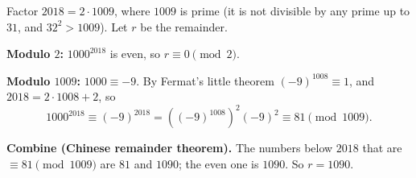 Factor $2018=2\cdot1009$, where $1009$ is prime (it is not divisible by any prime up to $31$, and $32^2>1009$). Let $r$ be the remainder.

\textbf{Modulo $2$:} $1000^{2018}$ is even, so $r\equiv0\pmod2$.

\textbf{Modulo $1009$:} $1000\equiv-9$. By Fermat's little theorem $(-9)^{1008}\equiv1$, and $2018=2\cdot1008+2$, so
\[
1000^{2018}\equiv(-9)^{2018}=\left((-9)^{1008}\right)^2(-9)^2\equiv81\pmod{1009}.
\]

\textbf{Combine (Chinese remainder theorem).} The numbers below $2018$ that are $\equiv81\pmod{1009}$ are $81$ and $1090$; the even one is $1090$. So $r=\boxed{1090}$.
